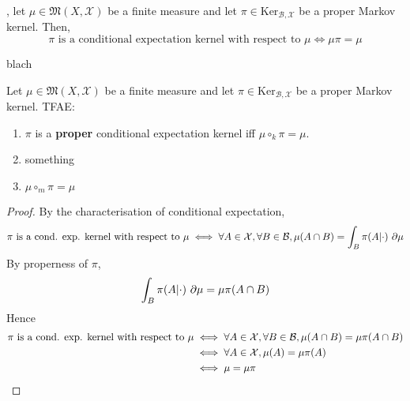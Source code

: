 \begin{lemma}
    \label{lem:cond-exp-ker-char}

    , let $\mu\in\mathfrak{M}(X,\mathcal{X})$ be a finite measure and let $\pi\in\text{Ker}_{\mathcal{B},\mathcal{X}}$ be a proper Markov kernel. Then,
    $$\pi \text{ is a conditional expectation kernel with respect to }\mu \iff \mu\pi = \mu$$
\end{lemma}

\begin{lemma}
    \label{lem:cond-exp-ker-markov-char}
    \leanok

    blach
\end{lemma}

\begin{lemma}
    \label{lem:cond-exp-ker-proper-tfae}
    \leanok

    Let $\mu \in \mathfrak{M}(X, \mathcal X)$ be a finite measure and let $\pi\in\text{Ker}_{\mathcal{B},\mathcal{X}}$ be a proper Markov kernel. TFAE:
    \begin{enumerate}
        \item $\pi$ is a \textbf{proper} conditional expectation kernel iff $\mu\circ_k \pi=\mu$.
        \item something
        \item $\mu\circ_m\pi=\mu$
    \end{enumerate}
\end{lemma}
\begin{proof}
    \leanok

    By the characterisation of conditional expectation,
    $$\pi \text{ is a cond. exp. kernel with respect to }\mu \iff \forall A \in \mathcal X, \forall B \in \mathcal B, \mu(A \cap B) = \int_B \pi(A|\cdot)\ \partial\mu$$
    By properness of $\pi$,
    $$\int_B \pi(A|\cdot)\ \partial\mu = \mu\pi(A \cap B)$$
    Hence
    \begin{align}
        \pi \text{ is a cond. exp. kernel with respect to }\mu
        & \iff \forall A \in \mathcal X, \forall B \in \mathcal B, \mu(A \cap B) = \mu\pi(A \cap B) \\
        & \iff \forall A \in \mathcal X, \mu(A) = \mu\pi(A) \\
        & \iff \mu = \mu\pi
    \end{align}
\end{proof}

